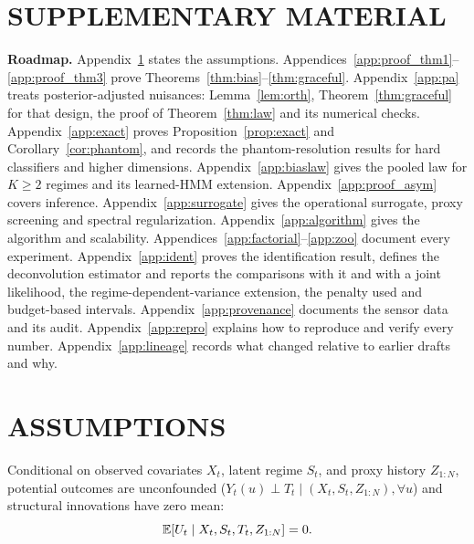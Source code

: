 \allowdisplaybreaks
\setlength{\emergencystretch}{3em}
\renewcommand{\arraystretch}{0.95}

\section*{SUPPLEMENTARY MATERIAL}
\noindent\textbf{Roadmap.}
Appendix~\ref{app:assumptions} states the assumptions.
Appendices~\ref{app:proof_thm1}--\ref{app:proof_thm3} prove Theorems~\ref{thm:bias}--\ref{thm:graceful}.
Appendix~\ref{app:pa} treats posterior-adjusted nuisances: Lemma~\ref{lem:orth}, Theorem~\ref{thm:graceful} for that design, the proof of Theorem~\ref{thm:law} and its numerical checks.
Appendix~\ref{app:exact} proves Proposition~\ref{prop:exact} and Corollary~\ref{cor:phantom}, and records the phantom-resolution results for hard classifiers and higher dimensions.
Appendix~\ref{app:biaslaw} gives the pooled law for $K\ge2$ regimes and its learned-HMM extension.
Appendix~\ref{app:proof_asym} covers inference.
Appendix~\ref{app:surrogate} gives the operational surrogate, proxy screening and spectral regularization.
Appendix~\ref{app:algorithm} gives the algorithm and scalability.
Appendices~\ref{app:factorial}--\ref{app:zoo} document every experiment.
Appendix~\ref{app:ident} proves the identification result, defines the deconvolution estimator and reports the comparisons with it and with a joint likelihood, the regime-dependent-variance extension, the penalty used and budget-based intervals.
Appendix~\ref{app:provenance} documents the sensor data and its audit.
Appendix~\ref{app:repro} explains how to reproduce and verify every number.
Appendix~\ref{app:lineage} records what changed relative to earlier drafts and why.

\section{ASSUMPTIONS}
\label{app:assumptions}
\begin{assumption}
\label{ass:unconfoundedness}
Conditional on observed covariates $X_t$, latent regime $S_t$, and proxy history $Z_{1:N}$, potential outcomes are unconfounded ($Y_t(u) \perp T_t \mid (X_t, S_t, Z_{1:N}), \forall u$) and structural innovations have zero mean:
\begin{equation}
    \mathbb{E}[U_t \mid X_t, S_t, T_t, Z_{1:N}] = 0.
\end{equation}
\end{assumption}

